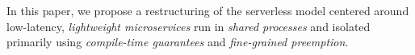 In this paper, we propose a restructuring of the serverless model centered around
low-latency, \textit{lightweight microservices} run in \textit{shared processes}
and isolated primarily using \textit{compile-time guarantees} and
\textit{fine-grained preemption}.



